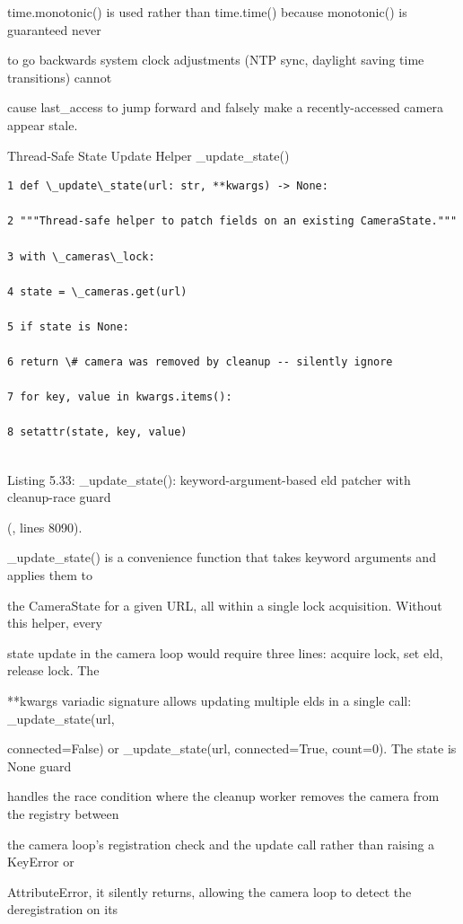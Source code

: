 time.monotonic() is used rather than time.time() because monotonic() is guaranteed never

to go backwards  system clock adjustments (NTP sync, daylight saving time transitions) cannot

cause last\_access to jump forward and falsely make a recently-accessed camera appear stale.

Thread-Safe State Update Helper  \_update\_state()

\begin{listingbox}
	\begin{verbatim}
1 def \_update\_state(url: str, **kwargs) -> None:

2 """Thread-safe helper to patch fields on an existing CameraState."""

3 with \_cameras\_lock:

4 state = \_cameras.get(url)

5 if state is None:

6 return \# camera was removed by cleanup -- silently ignore

7 for key, value in kwargs.items():

8 setattr(state, key, value)


\end{verbatim}
\end{listingbox}
Listing 5.33: \_update\_state(): keyword-argument-based eld patcher with cleanup-race guard

(, lines 8090).

\_update\_state() is a convenience function that takes keyword arguments and applies them to

the CameraState for a given URL, all within a single lock acquisition. Without this helper, every

state update in the camera loop would require three lines: acquire lock, set eld, release lock. The

**kwargs variadic signature allows updating multiple elds in a single call: \_update\_state(url,

connected=False) or \_update\_state(url, connected=True, count=0). The state is None guard

handles the race condition where the cleanup worker removes the camera from the registry between

the camera loop's registration check and the update call  rather than raising a KeyError or

AttributeError, it silently returns, allowing the camera loop to detect the deregistration on its

